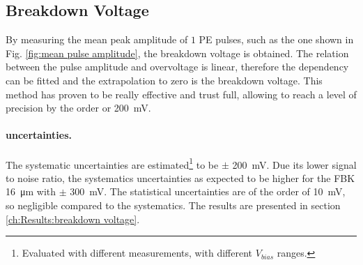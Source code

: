 \subsection{Breakdown Voltage}
\label{ch:Experimental methods:breakdown voltage}
By measuring the mean peak amplitude of $1$ PE pulses, such as the one shown in Fig. \ref{fig:mean pulse amplitude}, the breakdown voltage is obtained. 
The relation between the pulse amplitude and overvoltage is linear, therefore the dependency can be fitted and the extrapolation to zero is the breakdown voltage. This method has proven to be really effective and trust full, allowing to reach a level of precision by the order or \SI{200}{\milli V}.


\paragraph{uncertainties.}  The systematic uncertainties are estimated\footnote{Evaluated with different measurements, with different $V_{bias}$ ranges.} to be $\pm$ \SI{200}{\milli V}. Due its lower signal to noise ratio, the systematics uncertainties as expected to be higher for the FBK \SI{16}{\micro m} with $\pm$ \SI{300}{mV}.
The statistical uncertainties are of the order of \SI{10}{ \milli V}, so negligible compared to the systematics.
The results are presented in section \ref{ch:Results:breakdown voltage}.



